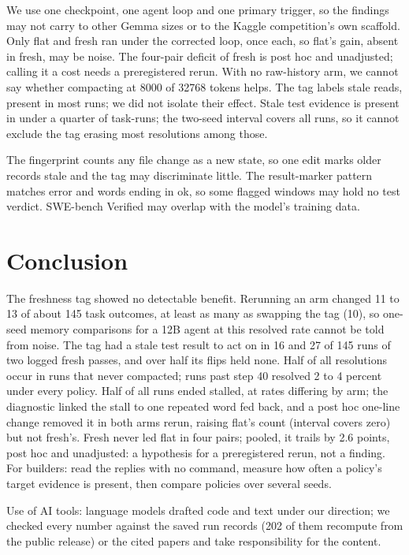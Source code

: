 \documentclass[11pt,a4paper]{article}
\begin{document}
We use one checkpoint, one agent loop and one primary trigger, so the findings may not carry to other Gemma sizes or to the Kaggle competition's own scaffold. Only flat and fresh ran under the corrected loop, once each, so flat's gain, absent in fresh, may be noise. The four-pair deficit of fresh is post hoc and unadjusted; calling it a cost needs a preregistered rerun. With no raw-history arm, we cannot say whether compacting at 8000 of 32768 tokens helps. The tag labels stale reads, present in most runs; we did not isolate their effect. Stale test evidence is present in under a quarter of task-runs; the two-seed interval covers all runs, so it cannot exclude the tag erasing most resolutions among those.

The fingerprint counts any file change as a new state, so one edit marks older records stale and the tag may discriminate little. The result-marker pattern matches error and words ending in ok, so some flagged windows may hold no test verdict. SWE-bench Verified may overlap with the model's training data.

\section{Conclusion}

The freshness tag showed no detectable benefit. Rerunning an arm changed 11 to 13 of about 145 task outcomes, at least as many as swapping the tag (10), so one-seed memory comparisons for a 12B agent at this resolved rate cannot be told from noise. The tag had a stale test result to act on in 16 and 27 of 145 runs of two logged fresh passes, and over half its flips held none. Half of all resolutions occur in runs that never compacted; runs past step 40 resolved 2 to 4 percent under every policy. Half of all runs ended stalled, at rates differing by arm; the diagnostic linked the stall to one repeated word fed back, and a post hoc one-line change removed it in both arms rerun, raising flat's count (interval covers zero) but not fresh's. Fresh never led flat in four pairs; pooled, it trails by 2.6 points, post hoc and unadjusted: a hypothesis for a preregistered rerun, not a finding. For builders: read the replies with no command, measure how often a policy's target evidence is present, then compare policies over several seeds.

\bigskip
\noindent Use of AI tools: language models drafted code and text under our direction; we checked every number against the saved run records (202 of them recompute from the public release) or the cited papers and take responsibility for the content.



\end{document}
